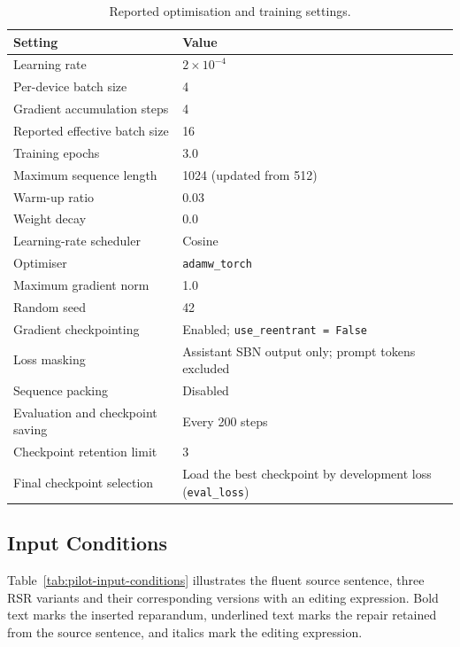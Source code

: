\documentclass{article}
\begin{document}
\begin{table}[htbp]
\centering
\small
\begin{tabular}{@{}p{}p{}@{}}
\toprule
Setting & Value \\
\midrule
Learning rate & $2\times10^{-4}$ \\
Per-device batch size & 4 \\
Gradient accumulation steps & 4 \\
Reported effective batch size & 16 \\
Training epochs & 3.0 \\
Maximum sequence length & 1024 (updated from 512) \\
Warm-up ratio & 0.03 \\
Weight decay & 0.0 \\
Learning-rate scheduler & Cosine \\
Optimiser & \texttt{adamw\_torch} \\
Maximum gradient norm & 1.0 \\
Random seed & 42 \\
Gradient checkpointing & Enabled; \texttt{use\_reentrant = False} \\
Loss masking & Assistant SBN output only; prompt tokens excluded \\
Sequence packing & Disabled \\
Evaluation and checkpoint saving & Every 200 steps \\
Checkpoint retention limit & 3 \\
Final checkpoint selection & Load the best checkpoint by development loss
  (\texttt{eval\_loss}) \\
\bottomrule
\end{tabular}
\caption{Reported optimisation and training settings.}
\label{tab:pilot-optimisation}
\end{table}

\subsection{Input Conditions}

Table~\ref{tab:pilot-input-conditions} illustrates the fluent source sentence, three RSR
variants and their corresponding versions with an editing expression. Bold text
marks the inserted reparandum, underlined text marks the repair retained from
the source sentence, and italics mark the editing expression.
\end{document}
